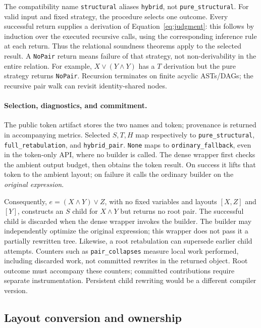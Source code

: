 \documentclass[10pt]{article}
\theoremstyle{plain}
\theoremstyle{definition}
\theoremstyle{remark}
\begin{document}
The compatibility name \texttt{structural} aliases \texttt{hybrid}, not \texttt{pure\_structural}. For valid input and fixed strategy, the procedure selects one outcome. Every successful return supplies a derivation of Equation~\eqref{eq:judgment}: this follows by induction over the executed recursive calls, using the corresponding inference rule at each return. Thus the relational soundness theorems apply to the selected result. A \texttt{NoPair} return means failure of that strategy, not non-derivability in the entire relation. For example, $X\lor(Y\land Y)$ has a $T$ derivation but the pure strategy returns \texttt{NoPair}. Recursion terminates on finite acyclic ASTs/DAGs; the recursive pair walk can revisit identity-shared nodes.

\paragraph{Selection, diagnostics, and commitment.}
The public token artifact stores the two names and token; provenance is returned in accompanying metrics. Selected $S,T,H$ map respectively to \texttt{pure\_structural}, \texttt{full\_retabulation}, and \texttt{hybrid\_pair}. \texttt{None} maps to \texttt{ordinary\_fallback}, even in the token-only API, where no builder is called. The dense wrapper first checks the ambient output budget, then obtains the token result. On success it lifts that token to the ambient layout; on failure it calls the ordinary builder on the \emph{original expression}.

Consequently, $e=(X\land Y)\lor Z$, with no fixed variables and layouts $[X,Z]$ and $[Y]$, constructs an $S$ child for $X\land Y$ but returns no root pair. The successful child is discarded when the dense wrapper invokes the builder. The builder may independently optimize the original expression; this wrapper does not pass it a partially rewritten tree. Likewise, a root retabulation can supersede earlier child attempts. Counters such as \texttt{pair\_collapses} measure local work performed, including discarded work, not committed rewrites in the returned object. Root outcome must accompany these counters; committed contributions require separate instrumentation. Persistent child rewriting would be a different compiler version.

\subsection{Layout conversion and ownership}
\end{document}
